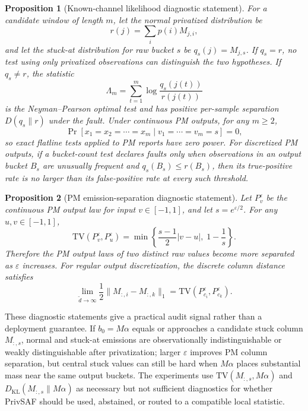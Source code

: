 \documentclass[conference]{IEEEtran}
\newtheorem{proposition}{Proposition}
\newcommand{\TV}{\mathrm{TV}}
\begin{document}
\begin{proposition}[Known-channel likelihood diagnostic statement]
\label{prop:channel-advantage}
For a candidate window of length \(m\), let the normal privatized distribution be
\[
r(j)=\sum_i p(i)M_{j,i},
\]
and let the stuck-at distribution for raw bucket \(s\) be \(q_s(j)=M_{j,s}\). If \(q_s=r\), no test using only privatized observations can distinguish the two hypotheses. If \(q_s\ne r\), the statistic
\[
\Lambda_m=\sum_{t=1}^{m}\log\frac{q_s(j(t))}{r(j(t))}
\]
is the Neyman--Pearson optimal test and has positive per-sample separation \(D(q_s\|r)\) under the fault. Under continuous PM outputs, for any \(m\ge2\),
\[
\Pr[x_1=x_2=\cdots=x_m\mid v_1=\cdots=v_m=s]=0,
\]
so exact flatline tests applied to PM reports have zero power. For discretized PM outputs, if a bucket-count test declares faults only when observations in an output bucket \(B_s\) are unusually frequent and \(q_s(B_s)\le r(B_s)\), then its true-positive rate is no larger than its false-positive rate at every such threshold.
\end{proposition}

\begin{proposition}[PM emission-separation diagnostic statement]
\label{prop:pm-separation}
Let \(P_v^\varepsilon\) be the continuous PM output law for input \(v\in[-1,1]\), and let \(s=e^{\varepsilon/2}\). For any \(u,v\in[-1,1]\),
\[
\TV(P_v^\varepsilon,P_u^\varepsilon)
=
\min\left\{
\frac{s-1}{2}|v-u|,
\;
1-\frac{1}{s}
\right\}.
\]
Therefore the PM output laws of two distinct raw values become more separated as \(\varepsilon\) increases. For regular output discretization, the discrete column distance satisfies
\[
\lim_{\tilde d\rightarrow\infty}
\frac{1}{2}\|M_{:,i}-M_{:,k}\|_1
=
\TV(P_{c_i}^\varepsilon,P_{c_k}^\varepsilon).
\]
\end{proposition}

These diagnostic statements give a practical audit signal rather than a deployment guarantee. If \(b_0=M\alpha\) equals or approaches a candidate stuck column \(M_{:,s}\), normal and stuck-at emissions are observationally indistinguishable or weakly distinguishable after privatization; larger \(\varepsilon\) improves PM column separation, but central stuck values can still be hard when \(M\alpha\) places substantial mass near the same output buckets. The experiments use \(\TV(M_{:,s},M\alpha)\) and \(D_{\mathrm{KL}}(M_{:,s}\|M\alpha)\) as necessary but not sufficient diagnostics for whether PrivSAF should be used, abstained, or routed to a compatible local statistic.
\end{document}
